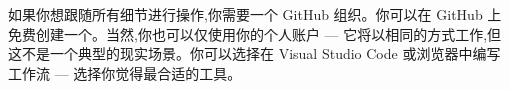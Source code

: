 如果你想跟随所有细节进行操作,你需要一个 GitHub 组织。你可以在 GitHub 上免费创建一个。当然,你也可以仅使用你的个人账户 --- 它将以相同的方式工作,但这不是一个典型的现实场景。你可以选择在 Visual Studio Code 或浏览器中编写工作流 --- 选择你觉得最合适的工具。